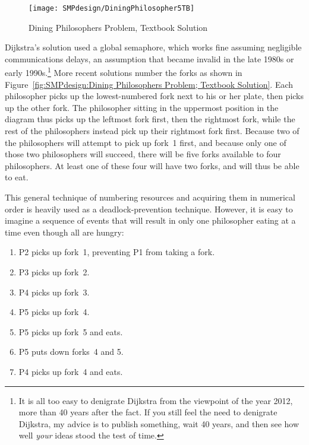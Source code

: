 \begin{figure}[tb]
\centering
\texttt{[image: SMPdesign/DiningPhilosopher5TB]}
\caption{Dining Philosophers Problem, Textbook Solution}
\end{figure}

Dijkstra's solution used a global semaphore, which works fine assuming
negligible communications delays, an assumption that became invalid
in the late 1980s or early 1990s.\footnote{
	It is all too easy to denigrate Dijkstra from the viewpoint
	of the year 2012, more than 40 years after the fact.
	If you still feel the need to denigrate Dijkstra, my advice
	is to publish something, wait 40 years, and then see
	how well \emph{your} ideas stood the test of time.}
More recent solutions number the forks as shown in
Figure~\ref{fig:SMPdesign:Dining Philosophers Problem; Textbook Solution}.
Each philosopher picks up the lowest-numbered fork next to his or her
plate, then picks up the other fork.
The philosopher sitting in the uppermost position in the diagram thus
picks up the leftmost fork first, then the rightmost fork, while the
rest of the philosophers instead pick up their rightmost fork first.
Because two of the philosophers will attempt to pick up fork~1 first,
and because only one of those two philosophers will succeed,
there will be five forks available to four philosophers.
At least one of these four will have two forks, and will thus be able
to eat.

This general technique of numbering resources and acquiring them in
numerical order is heavily used as a deadlock-prevention technique.
However, it is easy to imagine a sequence of events that will result
in only one philosopher eating at a time even though all are hungry:

\begin{enumerate}
    \item P2 picks up fork~1, preventing P1 from taking a fork.
    \item P3 picks up fork~2.
    \item P4 picks up fork~3.
    \item P5 picks up fork~4.
    \item P5 picks up fork~5 and eats.
    \item P5 puts down forks~4 and 5.
    \item P4 picks up fork~4 and eats.
\end{enumerate}


